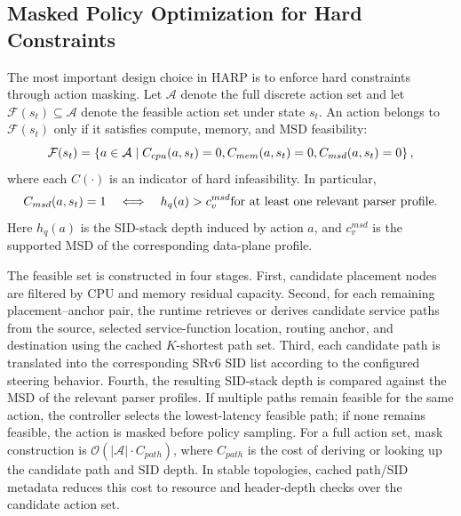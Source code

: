 \documentclass[final,5p]{elsarticle}
\begin{document}
\subsection{Masked Policy Optimization for Hard Constraints}
\label{subsec:harp_masking}

The most important design choice in HARP is to enforce hard constraints through action masking. Let \(\mathcal{A}\) denote the full discrete action set and let \(\mathcal{F}(s_t) \subseteq \mathcal{A}\) denote the feasible action set under state \(s_t\). An action belongs to \(\mathcal{F}(s_t)\) only if it satisfies compute, memory, and MSD feasibility:
\begin{equation}
    \mathcal{F}(s_t) =
    \left\{
        a \in \mathcal{A}
        \mid
        C_{cpu}(a,s_t)=0,
        C_{mem}(a,s_t)=0, \\
        C_{msd}(a,s_t)=0
    \right\},
\end{equation}
where each \(C(\cdot)\) is an indicator of hard infeasibility. In particular,
\begin{equation}
    C_{msd}(a,s_t)=1
    \quad \Longleftrightarrow \quad
    h_q(a) > c_v^{msd}
    \\ \text{for at least one relevant parser profile}.
\end{equation}
Here \(h_q(a)\) is the SID-stack depth induced by action \(a\), and \(c_v^{msd}\) is the supported MSD of the corresponding data-plane profile.

The feasible set is constructed in four stages. First, candidate placement nodes are filtered by CPU and memory residual capacity. Second, for each remaining placement--anchor pair, the runtime retrieves or derives candidate service paths from the source, selected service-function location, routing anchor, and destination using the cached \(K\)-shortest path set. Third, each candidate path is translated into the corresponding SRv6 SID list according to the configured steering behavior. Fourth, the resulting SID-stack depth is compared against the MSD of the relevant parser profiles. If multiple paths remain feasible for the same action, the controller selects the lowest-latency feasible path; if none remains feasible, the action is masked before policy sampling. For a full action set, mask construction is \(\mathcal{O}(|\mathcal{A}| \cdot C_{path})\), where \(C_{path}\) is the cost of deriving or looking up the candidate path and SID depth. In stable topologies, cached path/SID metadata reduces this cost to resource and header-depth checks over the candidate action set.
\end{document}
